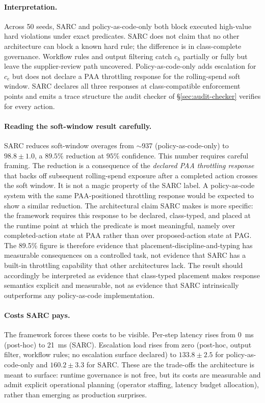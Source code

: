 \documentclass[11pt,a4paper]{article}
\theoremstyle{remark}
\begin{document}
\paragraph{Interpretation.} Across 50 seeds, SARC and policy-as-code-only both block executed high-value hard violations under exact predicates. SARC does not claim that no other architecture can block a known hard rule; the difference is in class-complete governance. Workflow rules and output filtering catch $c_h$ partially or fully but leave the supplier-review path uncovered. Policy-as-code-only adds escalation for $c_e$ but does not declare a PAA throttling response for the rolling-spend soft window. SARC declares all three responses at class-compatible enforcement points and emits a trace structure the audit checker of \S\ref{sec:audit-checker} verifies for every action.

\paragraph{Reading the soft-window result carefully.} SARC reduces soft-window overages from $\sim$937 (policy-as-code-only) to $98.8 \pm 1.0$, a $89.5\%$ reduction at $95\%$ confidence. This number requires careful framing. The reduction is a consequence of the \emph{declared PAA throttling response} that backs off subsequent rolling-spend exposure after a completed action crosses the soft window. It is not a magic property of the SARC label. A policy-as-code system with the same PAA-positioned throttling response would be expected to show a similar reduction. The architectural claim SARC makes is more specific: the framework requires this response to be declared, class-typed, and placed at the runtime point at which the predicate is most meaningful, namely over completed-action state at PAA rather than over proposed-action state at PAG. The 89.5\% figure is therefore evidence that placement-discipline-and-typing has measurable consequences on a controlled task, not evidence that SARC has a built-in throttling capability that other architectures lack. The result should accordingly be interpreted as evidence that class-typed placement makes response semantics explicit and measurable, not as evidence that SARC intrinsically outperforms any policy-as-code implementation.

\paragraph{Costs SARC pays.} The framework forces these costs to be visible. Per-step latency rises from 0~ms (post-hoc) to 21~ms (SARC). Escalation load rises from zero (post-hoc, output filter, workflow rules; no escalation surface declared) to $133.8 \pm 2.5$ for policy-as-code-only and $160.2 \pm 3.3$ for SARC. These are the trade-offs the architecture is meant to surface: runtime governance is not free, but its costs are measurable and admit explicit operational planning (operator staffing, latency budget allocation), rather than emerging as production surprises.
\end{document}
